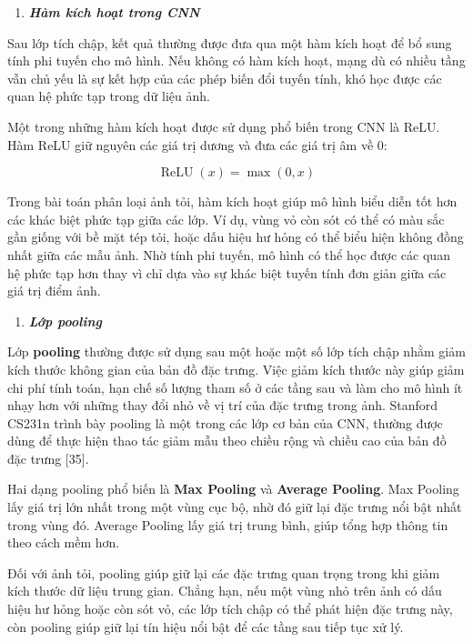 \documentclass[
]{article}
\begin{document}
\begin{enumerate}
\def\labelenumi{\arabic{enumi}.}
\item
  \protect{}\label{_Toc232112007}{}\emph{\textbf{Hàm kích
  hoạt trong CNN}}
\end{enumerate}

Sau lớp tích chập, kết quả thường được đưa qua một hàm kích hoạt để bổ
sung tính phi tuyến cho mô hình. Nếu không có hàm kích hoạt, mạng dù có
nhiều tầng vẫn chủ yếu là sự kết hợp của các phép biến đổi tuyến tính,
khó học được các quan hệ phức tạp trong dữ liệu ảnh.

Một trong những hàm kích hoạt được sử dụng phổ biến trong CNN là ReLU.
Hàm ReLU giữ nguyên các giá trị dương và đưa các giá trị âm về 0:

\[
\operatorname{ReLU}(x)=\max(0,x)
\]

Trong bài toán phân loại ảnh tỏi, hàm kích hoạt giúp mô hình biểu diễn
tốt hơn các khác biệt phức tạp giữa các lớp. Ví dụ, vùng vỏ còn sót có
thể có màu sắc gần giống với bề mặt tép tỏi, hoặc dấu hiệu hư hỏng có
thể biểu hiện không đồng nhất giữa các mẫu ảnh. Nhờ tính phi tuyến, mô
hình có thể học được các quan hệ phức tạp hơn thay vì chỉ dựa vào sự
khác biệt tuyến tính đơn giản giữa các giá trị điểm ảnh.

\begin{enumerate}
\def\labelenumi{\arabic{enumi}.}
\setcounter{enumi}{1}
\item
  \protect{}\label{_Toc232112008}{}\emph{\textbf{Lớp
  pooling}}
\end{enumerate}

Lớp \textbf{pooling} thường được sử dụng sau một hoặc một số lớp tích
chập nhằm giảm kích thước không gian của bản đồ đặc trưng. Việc giảm
kích thước này giúp giảm chi phí tính toán, hạn chế số lượng tham số ở
các tầng sau và làm cho mô hình ít nhạy hơn với những thay đổi nhỏ về vị
trí của đặc trưng trong ảnh. Stanford CS231n trình bày pooling là một
trong các lớp cơ bản của CNN, thường được dùng để thực hiện thao tác
giảm mẫu theo chiều rộng và chiều cao của bản đồ đặc trưng {[}35{]}.

Hai dạng pooling phổ biến là \textbf{Max Pooling} và \textbf{Average
Pooling}. Max Pooling lấy giá trị lớn nhất trong một vùng cục bộ, nhờ đó
giữ lại đặc trưng nổi bật nhất trong vùng đó. Average Pooling lấy giá
trị trung bình, giúp tổng hợp thông tin theo cách mềm hơn.

Đối với ảnh tỏi, pooling giúp giữ lại các đặc trưng quan trọng trong khi
giảm kích thước dữ liệu trung gian. Chẳng hạn, nếu một vùng nhỏ trên ảnh
có dấu hiệu hư hỏng hoặc còn sót vỏ, các lớp tích chập có thể phát hiện
đặc trưng này, còn pooling giúp giữ lại tín hiệu nổi bật để các tầng sau
tiếp tục xử lý.
\end{document}
